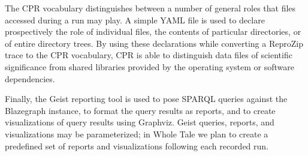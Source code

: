 The CPR vocabulary distinguishes between a number of general roles that files accessed during a run may play. A simple YAML file is used to declare prospectively the role of individual files, the contents of particular directories, or of entire directory trees. By using these declarations while converting a ReproZip trace to the CPR vocabulary, CPR is able to distinguish data files of scientific significance from shared libraries provided by the operating system or software dependencies.

Finally, the Geist reporting tool is used to pose SPARQL queries against the Blazegraph instance, to format the query results as reports, and to create visualizations of query results using Graphviz.  Geist queries, reports, and visualizations may be parameterized; in Whole Tale we plan to create a predefined set of reports and visualizations following each recorded run.

